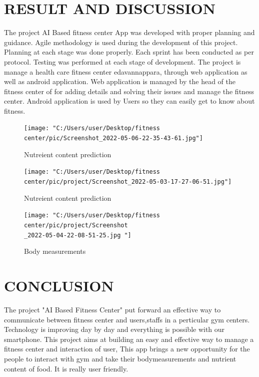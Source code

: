 \documentclass[a4paper,12pt,toc=flat]{report}
\begin{document}
	\pagebreak
	
	
		\chapter{RESULT AND DISCUSSION}
	
	
	The project AI Based fitness center App was developed with proper planning and guidance. Agile methodology is used during the development of this project. Planning at each stage was done properly. Each sprint has been conducted as per protocol. Testing was performed at each stage of development. The project is  manage a health care fitness center edavannappara, through web application as well as android application.
	Web application is managed by the head of the fitness center of for adding details and solving their issues and manage the fitness center. Android application is used by Users so they can easily get to know about fitness.
\begin{figure}[!ht]
	\begin{minipage}{0.4\linewidth}
		\texttt{[image: "C:/Users/user/Desktop/fitness center/pic/Screenshot\_2022-05-06-22-35-43-61.jpg"]}
		\caption{Nutreient content prediction}
	\end{minipage}
	\hfill
	\begin{minipage}{0.4\linewidth}
		\texttt{[image: "C:/Users/user/Desktop/fitness center/pic/project/Screenshot\_2022-05-03-17-27-06-51.jpg"]}
		\caption{Nutreient content prediction }
	\end{minipage}
	\end{figure}
		\begin{figure}[!ht]
			\begin{minipage}{0.4\linewidth}
				\texttt{[image: "C:/Users/user/Desktop/fitness center/pic/project/Screenshot\\\_2022-05-04-22-08-51-25.jpg	"]}
				\caption{Body measurements}
			\end{minipage}
		
	
	
\end{figure}
	\newpage

	
	\chapter{CONCLUSION}
	
	
	The project "AI Based Fitness Center" put forward an effective way to communicate between fitness center and users,staffs in a perticular gym centers. Technology is improving day by day and everything is possible with our smartphone. This project aims at building an easy and effective way to manage a fitness center and interaction of user, This app brings a new opportunity for the people to interact with gym and take their bodymeasurements and nutrient content of food. It is really user friendly.
	
\end{document}
